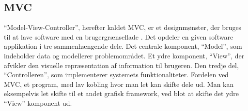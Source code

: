 \subsection{MVC}
\enquote{Model-View-Controller}, herefter kaldet MVC, er et designmønster, der bruges til at lave software med en brugergrænseflade \cite{mvcLecture}. Det opdeler en given software applikation i tre sammenhængende dele. Det centrale komponent, \enquote{Model}, som indeholder data og modellerer problemområdet. Et ydre komponent, \enquote{View}, der afvikler den visuelle repræsentation af information til brugeren. Den tredje del, \enquote{Controlleren}, som implementerer systemets funktionaliteter. Fordelen ved MVC, et program, med lav kobling hvor man let kan skifte dele ud. Man kan eksempelvis let skifte til et andet grafisk framework, ved blot at skifte det ydre \enquote{View} komponent ud.

